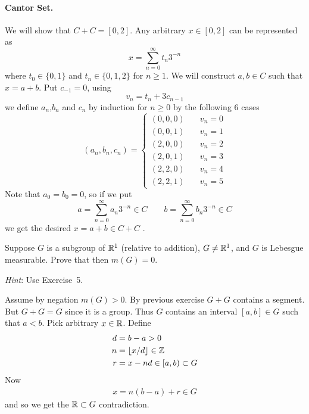 \begin{enumerate}
\paragraph{Cantor Set.} 
We will show that \(C+C = [0,2]\).
Any arbitrary \(x\in[0,2]\) can be represented as
\begin{equation*}
x = \sum_{n=0}^\infty t_n 3^{-n}
\end{equation*}
where \(t_0\in\{0,1\}\) and \(t_n\in\{0,1,2\}\) for \(n\geq 1\).
We will construct \(a,b\in C\) such that \(x=a+b\).
Put \(c_{-1} = 0\), using
\begin{equation*}
v_n = t_n + 3c_{n-1}
\end{equation*}
we define \(a_n\),\(b_n\) and \(c_n\) 
by induction for \(n\geq 0\) by the following 6 cases
\begin{equation*}
(a_n,b_n,c_n) = 
\left
\{\begin{array}{ll}
(0,0,0) \quad & v_n = 0 \\
(0,0,1) \quad & v_n = 1 \\
(2,0,0) \quad & v_n = 2 \\
(2,0,1) \quad & v_n = 3 \\
(2,2,0) \quad & v_n = 4 \\
(2,2,1) \quad & v_n = 5
\end{array}\right.
\end{equation*}
Note that \(a_0 = b_0 = 0\), so  if we put
\begin{equation*}
a = \sum_{n=0}^\infty a_n 3^{-n} \in C
\qquad
b = \sum_{n=0}^\infty b_n 3^{-n} \in C
\end{equation*}
we get the desired \(x = a + b \in C + C\) .
 

\begin{excopy}
Suppose $G$ is a subgroup of \(\mathbb{R}^1\) (relative to addition),
\(G\neq \mathbb{R}^1\), and $G$ is Lebesgue measurable. Prove that then \(m(G)=0\).

\emph{Hint}: Use Exercise~5.
\end{excopy}

Assume by negation \(m(G)>0\). By previous exercise \(G+G\) contains a segment.
But \(G+G=G\) since it is a group. Thus $G$ contains an interval 
\([a,b]\in G\) such that \(a<b\).
Pick arbitrary \(x\in \mathbb{R}\). Define
\begin{align*}
d &= b - a > 0\\
n &= \lfloor x / d \rfloor \in \mathbb{Z} \\
r &= x - nd \in [a,b) \subset G
\end{align*}
Now 
\begin{align*}
x = n(b-a) + r \in G
\end{align*}
and so we get the \(\mathbb{R} \subset G\) contradiction.



\end{enumerate}
